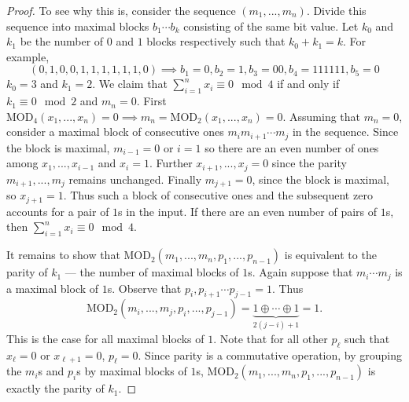\documentclass[11pt]{article}
\newcommand\ff[1]{\mathrm{#1}}
\DeclareMathOperator\xor{\oplus}
\begin{document}
\begin{proof}
To see why this is, consider the sequence $(m_1, ..., m_n)$. Divide this sequence into maximal blocks $b_1 \cdots b_k$ consisting of the same bit value. Let $k_0$ and $k_1$ be the number of $0$ and $1$ blocks respectively such that $k_0 + k_1 = k$. For example, 
\[(0,1,0,0,1,1,1,1,1,1,0) \implies b_1 = 0, b_2 = 1, b_3 = 00, b_4 = 111111, b_5 = 0\] 
$k_0 = 3$ and $k_1 = 2$. We claim that $\sum_{i = 1}^{n} x_i \equiv 0 \mod 4$ if and only if $k_1 \equiv 0 \mod 2$ and $m_n = 0$. First $\ff{MOD}_4(x_1, ..., x_n) = 0 \implies m_n = \ff{MOD}_2(x_1, ..., x_n) = 0$. Assuming that $m_n = 0$, consider a maximal block of consecutive ones $m_im_{i+1}\cdots m_{j}$ in the sequence. Since the block is maximal, $m_{i-1} = 0$ or $i = 1$ so there are an even number of ones among $x_1, ..., x_{i-1}$ and $x_i = 1$. Further $x_{i+1}, ..., x_{j} = 0$ since the parity $m_{i+1}, ..., m_{j}$ remains unchanged. Finally $m_{j+1} = 0$, since the block is maximal, so $x_{j+1} = 1$. Thus such a block of consecutive ones and the subsequent zero accounts for a pair of $1$s in the input. If there are an even number of pairs of $1$s, then $\sum_{i = 1}^{n} x_i \equiv 0 \mod 4$. 

It remains to show that $\ff{MOD}_2(m_1, ..., m_n, p_1, ..., p_{n-1})$ is equivalent to the parity of $k_1$ --- the number of maximal blocks of $1$s. Again suppose that $m_i\cdots m_{j}$ is a maximal block of $1$s. Observe that $p_i, p_{i+1} \cdots p_{j-1} = 1$. Thus 
\[\ff{MOD}_2(m_i, ..., m_{j}, p_i, ..., p_{j-1}) = \underbrace{1\xor\cdots \xor 1}_{2(j - i) + 1} = 1.\]
This is the case for all maximal blocks of $1$. Note that for all other $p_\ell$ such that $x_\ell = 0$ or $x_{\ell + 1} = 0$, $p_{\ell} = 0$. Since parity is a commutative operation, by grouping the $m_i$s and $p_i$s by maximal blocks of $1$s, $\ff{MOD}_2(m_1, ..., m_n, p_1, ..., p_{n-1})$ is exactly the parity of $k_1$. 

\end{proof}
\end{document}
